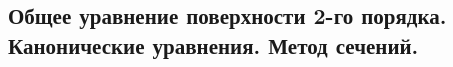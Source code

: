 \subsection{%
  Общее уравнение поверхности 2-го порядка. Канонические уравнения. Метод
  сечений.%
}

\todo
